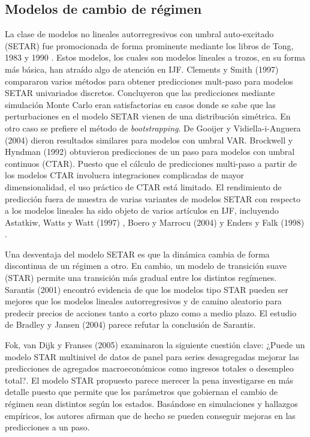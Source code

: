 \documentclass{llncs}
\begin{document}
\subsection{Modelos de cambio de régimen}
La clase de modelos no lineales autorregresivos con umbral auto-excitado (SETAR) fue promocionada de forma prominente mediante los libros de Tong, 1983  \cite{Tong1983} y 1990  \cite{Tong1990}. Estos modelos, los cuales son modelos lineales a trozos, en su forma más básica, han atraído algo de atención en IJF. Clements y Smith (1997)  \cite{Clements1997463} compararon varios métodos para obtener predicciones mult-paso para modelos SETAR univariados discretos. Concluyeron que las predicciones mediante simulación Monte Carlo eran satisfactorias en casos donde se sabe que las perturbaciones en el modelo SETAR vienen de una distribución simétrica. En otro caso se prefiere el método de \emph{bootstrapping}. De Gooijer y Vidiella-i-Anguera (2004) \cite{DeGooijer2004237} dieron resultados similares para modelos con umbral VAR. Brockwell y Hyndman (1992) \cite{Brockwell1992157} obtuvieron predicciones de un paso para modelos con umbral continuos (CTAR). Puesto que el cálculo de predicciones multi-paso a partir de los modelos CTAR involucra integraciones complicadas de mayor dimensionalidad, el uso práctico de CTAR está limitado. El rendimiento de predicción fuera de muestra de varias variantes de modelos SETAR con respecto a los modelos lineales ha sido objeto de varios artículos en IJF, incluyendo Astatkiw, Watts y Watt (1997) \cite{Astatkie1997105}, Boero y Marrocu (2004) \cite{Boero2004305}y Enders y Falk (1998) \cite{Enders1998171}.

Una desventaja del modelo SETAR es que la dinámica cambia de forma discontinua de un régimen a otro. En cambio, un modelo de transición suave (STAR) permite una transición más gradual entre los distintos regímenes. Sarantis (2001)\cite{Sarantis2001459} encontró evidencia de que los modelos tipo STAR pueden ser mejores que los modelos lineales autorregresivos y de camino aleatorio para predecir precios de acciones tanto a corto plazo como a medio plazo. El estudio de Bradley y Jansen (2004)\cite{Bradley2004321} parece refutar la conclusión de Sarantis.

Fok, van Dijk y Franses (2005) \cite{Fok2005785} examinaron la siguiente cuestión clave: ¿Puede un modelo STAR multinivel de datos de panel para series desagregadas mejorar las predicciones de agregados macroeconómicos como ingresos totales o desempleo total?. El modelo STAR propuesto parece merecer la pena investigarse en más detalle puesto que permite que los parámetros que gobiernan el cambio de régimen sean distintos según los estados. Basándose en simulaciones y hallazgos empíricos, los autores afirman que de hecho se pueden conseguir mejoras en las predicciones a un paso.
\end{document}
